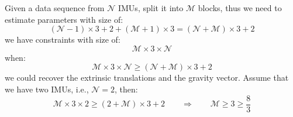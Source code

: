 \documentclass[12pt, onecolumn]{article}
\begin{document}
	Given a data sequence from $\mathcal{N}$ IMUs, split it into $\mathcal{M}$ blocks, thus we need to estimate parameters with size of:
	\begin{equation}
	\left( \mathcal{N}-1\right) \times 3+2+\left( \mathcal{M}+1\right) \times 3=
	\left(\mathcal{N}+\mathcal{M} \right)\times 3 +2
	\end{equation}
	we have constraints with size of:
	\begin{equation}
	\mathcal{M}\times 3\times \mathcal{N}
	\end{equation}
	when:
	\begin{equation}
	\mathcal{M}\times 3\times \mathcal{N}\ge \left(\mathcal{N}+\mathcal{M} \right)\times 3 +2
	\end{equation}
	we could recover the extrinsic translations and the gravity vector.
	Assume that we have two IMUs, i.e., $\mathcal{N}=2$, then:
	\begin{equation}
	\mathcal{M}\times 3\times 2\ge \left(2+\mathcal{M} \right)\times 3 +2
	\qquad\Rightarrow\qquad
	\mathcal{M}\ge 3\ge \frac{8}{3}
	\end{equation}
\end{document}

